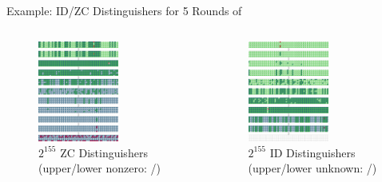\begin{frame}{Example: ID/ZC Distinguishers for 5 Rounds of  \cite{zeroplus_cryptoeprint_2023_1701}}
\vspace{-0.6cm}
\begin{columns}
\centering
\begin{figure}
\centering
\includegraphics[width=0.62\textwidth]{./figures/ascon_zc_5r.pdf}
\caption*{\scriptsize $2^{155}$ ZC Distinguishers (upper/lower nonzero: /)}
\end{figure}
\centering
\begin{figure}
\centering
\includegraphics[width=0.62\textwidth]{./figures/ascon_id_5r_sll_v0.pdf}
\caption*{\scriptsize $2^{155}$ ID Distinguishers (upper/lower unknown: /)}
\end{figure}
\end{columns}
\end{frame}
